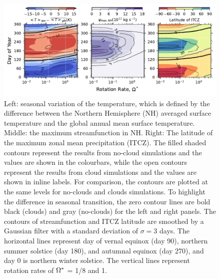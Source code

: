 \begin{figure}[htb]
   \centering
   \includegraphics[width=1.0\textwidth]{plots/9-Seasons_Effect.pdf}
   \caption{Left: seasonal variation of the temperature, which is defined by the difference between the Northern Hemisphere (NH) averaged surface temperature and the global annual mean surface temperature. Middle: the maximum streamfunction in NH. Right: The latitude of the maximum zonal mean precipitation (ITCZ). The filled shaded contours represent the results from no-cloud simulations and the values are shown in the colourbars, while the open contours represent the results from cloud simulations and the values are shown in inline labels. For comparison, the contours are plotted at the same levels for no-clouds and clouds simulations. To highlight the difference in seasonal transition, the zero contour lines are bold black (clouds) and gray (no-clouds) for the left and right panels. The contours of streamfunction and ITCZ latitude are smoothed by a Gaussian filter with a standard deviation of $\sigma = 3$ days. The horizontal lines represent day of vernal equinox (day 90), northern summer solstice (day 180), and autumnal equinox (day 270), and day 0 is northern winter solstice. The vertical lines represent rotation rates of $\Omega^*$ = 1/8 and 1.}
   \label{fig:Seasons_Effect-contour}
\end{figure}



